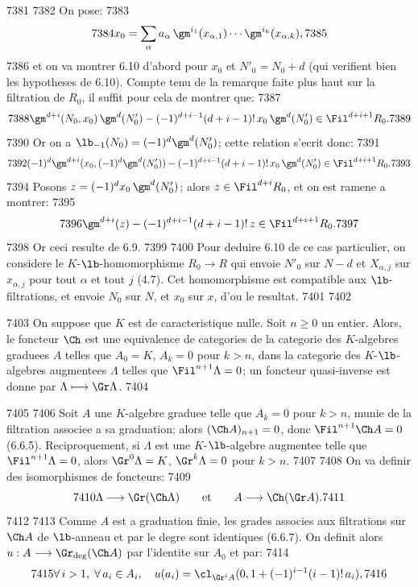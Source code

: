   7381	
  7382	On pose:
  7383	\[
  7384	x_0 = \sum_\alpha a_\alpha\, \gm^{i_1}(x_{\alpha,1}) \cdots \gm^{i_k}(x_{\alpha,k}),
  7385	\]
  7386	et on va montrer 6.10 d'abord pour $x_0$ et $N'_0 = N_0 + d$ (qui verifient bien les hypotheses de 6.10). Compte tenu de la remarque faite plus haut sur la filtration de $R_0$, il suffit pour cela de montrer que:
  7387	\[
  7388	\gm^{d+i}(N_0, x_0)\, \gm^d(N'_0) - (-1)^{d+i-1}(d+i-1)!\, x_0\, \gm^d(N'_0) \in \Fil^{d+i+1} R_0.
  7389	\]
  7390	Or on a $\lb_{-1}(N_0) = (-1)^d \gm^d(N'_0)$; cette relation s'ecrit donc:
  7391	\[
  7392	(-1)^d \gm^{d+i}(x_0, (-1)^d \gm^d(N'_0)) - (-1)^{d+i-1}(d+i-1)!\, x_0\, \gm^d(N'_0) \in \Fil^{d+i+1} R_0.
  7393	\]
  7394	Posons $z = (-1)^d x_0\, \gm^d(N'_0)$; alors $z \in \Fil^{d+i} R_0$, et on est ramene a montrer:
  7395	\[
  7396	\gm^{d+i}(z) - (-1)^{d+i-1}(d+i-1)!\, z \in \Fil^{d+i+1} R_0.
  7397	\]
  7398	Or ceci resulte de 6.9.
  7399	
  7400	Pour deduire 6.10 de ce cas particulier, on considere le $K$-$\lb$-homomorphisme $R_0 \longrightarrow R$ qui envoie $N'_0$ sur $N-d$ et $X_{\alpha,j}$ sur $x_{\alpha,j}$ pour tout $\alpha$ et tout $j$ (4.7). Cet homomorphisme est compatible aux $\lb$-filtrations, et envoie $N_0$ sur $N$, et $x_0$ sur $x$, d'ou le resultat.
  7401	
  7402	\begin{prop}
  7403	On suppose que $K$ est de caracteristique nulle. Soit $n \geqslant 0$ un entier. Alors, le foncteur $\Ch$ est une equivalence de categories de la categorie des $K$-algebres graduees $A$ telles que $A_0 = K$, $A_k = 0$ pour $k > n$, dans la categorie des $K$-$\lb$-algebres augmentees $\Lambda$ telles que $\Fil^{n+1} \Lambda = 0$; un foncteur quasi-inverse est donne par $\Lambda \longmapsto \Gr \Lambda$.
  7404	\end{prop}
  7405	
  7406	Soit $A$ une $K$-algebre graduee telle que $A_k = 0$ pour $k > n$, munie de la filtration associee a sa graduation; alors $(\Ch A)_{n+1} = 0$, donc $\Fil^{n+1} \Ch A = 0$ (6.6.5). Reciproquement, si $\Lambda$ est une $K$-$\lb$-algebre augmentee telle que $\Fil^{n+1} \Lambda = 0$, alors $\Gr^0 \Lambda = K$, $\Gr^k \Lambda = 0$ pour $k > n$.
  7407	
  7408	On va definir des isomorphismes de foncteurs:
  7409	\[
  7410	\Lambda \longrightarrow \Gr(\Ch \Lambda) \qquad \text{et} \qquad A \longrightarrow \Ch(\Gr A).
  7411	\]
  7412	
  7413	Comme $A$ est a graduation finie, les grades associes aux filtrations sur $\Ch A$ de $\lb$-anneau et par le degre sont identiques (6.6.7). On definit alors $u : A \longrightarrow \Gr_{\text{deg}}(\Ch A)$ par l'identite sur $A_0$ et par:
  7414	\[
  7415	\forall\, i > 1,\; \forall\, a_i \in A_i, \quad u(a_i) = \cl_{\Gr^i A}(0, 1+(-1)^{i-1}(i-1)!\, a_i),
  7416	\]
